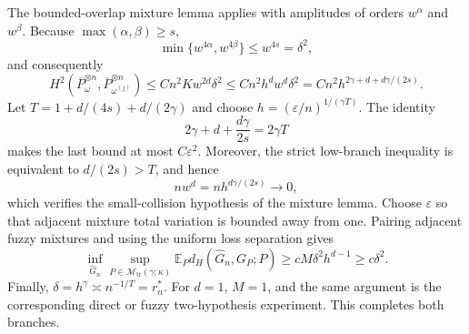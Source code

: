 The bounded-overlap mixture lemma applies with amplitudes of orders \(w^\alpha\) and \(w^\beta\). Because \(\max(\alpha,\beta)\ge s\),
\[
\min\{w^{4\alpha},w^{4\beta}\}\le w^{4s}=\delta^2,
\]
and consequently
\[
H^2(\overline P_\omega^{\otimes n},\overline P_{\omega^{(j)}}^{\otimes n})
\le Cn^2Kw^{2d}\delta^2
\le Cn^2h^dw^d\delta^2
=Cn^2h^{2\gamma+d+d\gamma/(2s)}.
\]
Let \(T=1+d/(4s)+d/(2\gamma)\) and choose \(h=(\varepsilon/n)^{1/(\gamma T)}\). The identity
\[
2\gamma+d+\frac{d\gamma}{2s}=2\gamma T
\]
makes the last bound at most \(C\varepsilon^2\). Moreover, the strict low-branch inequality is equivalent to \(d/(2s)>T\), and hence
\[
nw^d=nh^{d\gamma/(2s)}\longrightarrow0,
\]
which verifies the small-collision hypothesis of the mixture lemma. Choose \(\varepsilon\) so that adjacent mixture total variation is bounded away from one. Pairing adjacent fuzzy mixtures and using the uniform loss separation gives
\[
\inf_{\widehat G_n}\sup_{P\in\mathcal M_{\mathrm{tr}}(\gamma;\kappa)}
\mathbb E_P d_H(\widehat G_n,G_P;P)
\ge cM\delta^2h^{d-1}\ge c\delta^2.
\]
Finally, \(\delta=h^\gamma\asymp n^{-1/T}=r_n^*\). For \(d=1\), \(M=1\), and the same argument is the corresponding direct or fuzzy two-hypothesis experiment. This completes both branches.